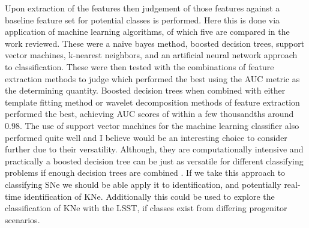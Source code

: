 \documentclass[12pt]{article}
\begin{document}
Upon extraction of the features then judgement of those features against a baseline feature set for potential classes is performed. Here this is done via application of machine learning algorithms, of which five are compared in the work reviewed. These were a naive bayes method, boosted decision trees, support vector machines, k-nearest neighbors, and an artificial neural network approach to classification. These were then tested with the combinations of feature extraction methods to judge which performed the best using the AUC metric as the determining quantity. Boosted decision trees when combined with either template fitting method or wavelet decomposition methods of feature extraction performed the best, achieving AUC scores of within a few thousandths around $0.98$. The use of support vector machines for the machine learning classifier also performed quite well and I believe would be an interesting choice to consider further due to their versatility. Although, they are computationally intensive and practically a boosted decision tree can be just as versatile for different classifying problems if enough decision trees are combined \citep{Lochner2016}. If we take this approach to classifying SNe we should be able apply it to identification, and potentially real-time identification of KNe. Additionally this could be used to explore the classification of KNe with the LSST, if classes exist from differing progenitor scenarios. \par
\end{document}
